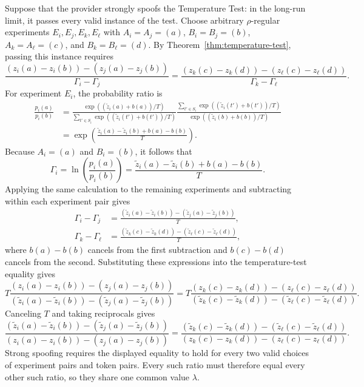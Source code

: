 \documentclass{article}
\begin{document}
Suppose that the provider strongly spoofs the Temperature Test: in the long-run
limit, it passes every valid instance of the test. Choose arbitrary
$\rho$-regular experiments $E_i,E_j,E_k,E_\ell$ with
$A_i=A_j=(a)$, $B_i=B_j=(b)$, $A_k=A_\ell=(c)$, and
$B_k=B_\ell=(d)$. By Theorem~\ref{thm:temperature-test}, passing this instance
requires
\[
\frac{(z_i(a)-z_i(b))-(z_j(a)-z_j(b))}{\Gamma_i-\Gamma_j}
=
\frac{(z_k(c)-z_k(d))-(z_\ell(c)-z_\ell(d))}
     {\Gamma_k-\Gamma_\ell}.
\]
For experiment $E_i$, the probability ratio is
\begin{align*}
\frac{p_i(a)}{p_i(b)}
&=\frac{\exp((\widetilde{z}_i(a)+b(a))/T)}
        {\sum_{t'\in S_i}\exp((\widetilde{z}_i(t')+b(t'))/T)}
  \frac{\sum_{t'\in S_i}\exp((\widetilde{z}_i(t')+b(t'))/T)}
       {\exp((\widetilde{z}_i(b)+b(b))/T)}\\
&=\exp\!\left(
\frac{\widetilde{z}_i(a)-\widetilde{z}_i(b)+b(a)-b(b)}{T}
\right).
\end{align*}
Because $A_i=(a)$ and $B_i=(b)$, it follows that
\[
\Gamma_i=\ln\!\left(\frac{p_i(a)}{p_i(b)}\right)
=\frac{\widetilde{z}_i(a)-\widetilde{z}_i(b)+b(a)-b(b)}{T}.
\]
Applying the same calculation to the remaining experiments and subtracting
within each experiment pair gives
\begin{align*}
\Gamma_i-\Gamma_j
&=\frac{(\widetilde{z}_i(a)-\widetilde{z}_i(b))-
        (\widetilde{z}_j(a)-\widetilde{z}_j(b))}{T},\\
\Gamma_k-\Gamma_\ell
&=\frac{(\widetilde{z}_k(c)-\widetilde{z}_k(d))-
        (\widetilde{z}_\ell(c)-\widetilde{z}_\ell(d))}{T},
\end{align*}
where $b(a)-b(b)$ cancels from the first subtraction and $b(c)-b(d)$
cancels from the second.
Substituting these expressions into the temperature-test equality gives
\[
T\frac{(z_i(a)-z_i(b))-(z_j(a)-z_j(b))}
{(\widetilde{z}_i(a)-\widetilde{z}_i(b))-
 (\widetilde{z}_j(a)-\widetilde{z}_j(b))}
=
T\frac{(z_k(c)-z_k(d))-(z_\ell(c)-z_\ell(d))}
{(\widetilde{z}_k(c)-\widetilde{z}_k(d))-
 (\widetilde{z}_\ell(c)-\widetilde{z}_\ell(d))}.
\]
Canceling $T$ and taking reciprocals gives
\[
\frac{(\widetilde{z}_i(a)-\widetilde{z}_i(b))-
      (\widetilde{z}_j(a)-\widetilde{z}_j(b))}
     {(z_i(a)-z_i(b))-(z_j(a)-z_j(b))}
=
\frac{(\widetilde{z}_k(c)-\widetilde{z}_k(d))-
      (\widetilde{z}_\ell(c)-\widetilde{z}_\ell(d))}
     {(z_k(c)-z_k(d))-(z_\ell(c)-z_\ell(d))}.
\]
Strong spoofing requires the displayed equality to hold for every two valid
choices of experiment pairs and token pairs. Every such ratio must therefore
equal every other such ratio, so they share one common value $\lambda$.
\end{document}
